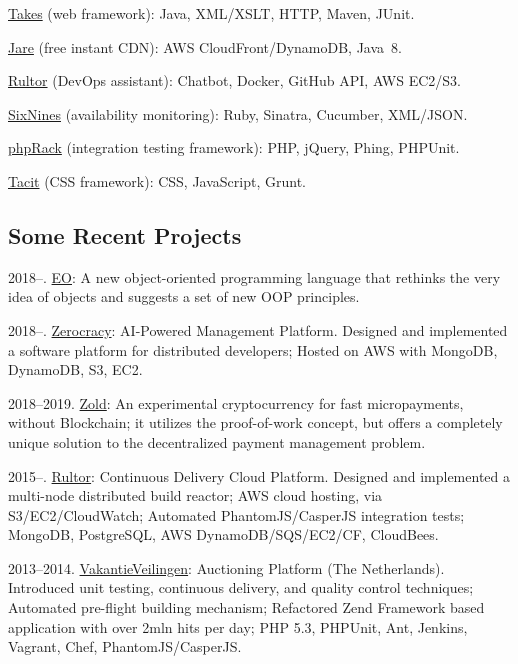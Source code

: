 \documentclass{yb}
\renewcommand\emph[1]{#1}
\begin{document}
\href{https://www.takes.org}{Takes} (web framework):
Java, XML/XSLT, HTTP, Maven, JUnit.

\href{https://www.jare.io}{Jare} (free instant CDN):
AWS CloudFront/DynamoDB, Java~8.

\href{https://www.rultor.com}{Rultor} (DevOps assistant):
Chatbot, Docker, GitHub API, AWS EC2/S3.

\href{https://www.sixnines.io}{SixNines} (availability monitoring):
Ruby, Sinatra, Cucumber, XML/JSON.

\href{https://www.phprack.com}{phpRack} (integration testing framework):
PHP, jQuery, Phing, PHPUnit.

\href{https://github.com/yegor256/tacit}{Tacit} (CSS framework):
CSS, JavaScript, Grunt.

\subsection*{Some Recent Projects}


2018--. \href{https://www.eolang.org}{\emph{EO}}: A new object-oriented
programming language that rethinks the very idea of objects
and suggests a set of new OOP principles.

2018--. \href{https://www.zerocracy.com}{\emph{Zerocracy}}: AI-Powered Management Platform.
Designed and implemented a software platform for distributed developers;
Hosted on AWS with MongoDB, DynamoDB, S3, EC2.

2018--2019. \href{https://www.zold.io}{\emph{Zold}}: An experimental cryptocurrency for
fast micropayments, without Blockchain; it utilizes the proof-of-work
concept, but offers a completely unique solution to the decentralized
payment management problem.

2015--. \href{https://www.rultor.com}{\emph{Rultor}}: Continuous Delivery Cloud Platform.
Designed and implemented a multi-node distributed build reactor;
AWS cloud hosting, via S3/EC2/CloudWatch;
Automated PhantomJS/CasperJS integration tests;
MongoDB, PostgreSQL, AWS DynamoDB/SQS/EC2/CF, CloudBees.

2013--2014. \href{https://www.VakantieVeilingen.nl}{\emph{VakantieVeilingen}}: Auctioning Platform (The Netherlands).
Introduced unit testing, continuous delivery, and quality control techniques;
Automated pre-flight building mechanism;
Refactored Zend Framework based application with over 2mln hits per day;
PHP 5.3, PHPUnit, Ant, Jenkins, Vagrant, Chef, PhantomJS/CasperJS.
\end{document}
